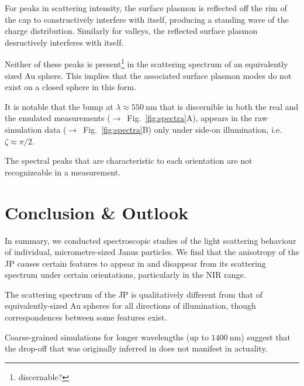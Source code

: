\documentclass[10pt]{article}
\newcommand{\seefig}[2]{\mbox{\sffamily($\rightarrow$ Fig. \ref{#1}#2)}}
\begin{document}
\begin{multicols}{2}
For peaks in scattering intensity, the surface plasmon is reflected off the rim of the cap to constructively interfere with itself, producing a standing wave of the charge distribution. 
Similarly for valleys, the reflected surface plasmon desructively interferes with itself.  

Neither of these peaks is present\footnote{discernable?} in the scattering spectrum of an equivalently sized Au sphere. 
This implies that the associated surface plasmon modes do not exist on a closed sphere in this form. 






It is notable that the bump at \mbox{$\lambda \approx \SI{550}{\nano\meter}$} that is discernible in both the real and the emulated measurements \seefig{fig:spectra}{A}, appears in the raw simulation data \seefig{fig:spectra}{B} only under side-on illumination, i.e. \mbox{$\zeta\approx\pi/2$}. 




The spectral peaks that are characteristic to each orientation are not recognizeable in a measurement. 



\section*{Conclusion \& Outlook}

In summary, we conducted spectroscopic studies of the light scattering behaviour of individual, micrometre-sized Janus particles. 
We find that the anisotropy of the JP causes certain features to appear in and disappear from its scattering spectrum under certain orientations, particularly in the NIR range. 

The scattering spectrum of the JP is qualitatively different from that of equivalently-sized Au spheres for all directions of illumination, though correspondences between some features exist.   

Coarse-grained simulations for longer wavelengths (up to $\SI{1400}{\nano\meter}$) suggest that the drop-off that was originally inferred in \cite*{MA} does not manifest in actuality. 


\end{multicols}
\end{document}
